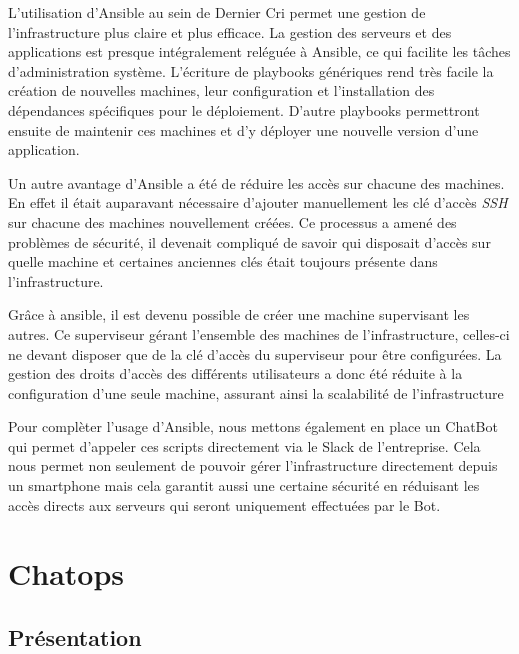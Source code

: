 \documentclass[12pt,a4paper]{article}
\begin{document}
  L'utilisation d'Ansible au sein de Dernier Cri permet une gestion de
  l'infrastructure plus claire et plus efficace. La gestion des serveurs
  et des applications est presque intégralement reléguée à Ansible, ce qui
  facilite les tâches d'administration système. L'écriture de playbooks
  génériques rend très facile la création de nouvelles machines, leur
  configuration et l'installation des dépendances spécifiques pour le
  déploiement. D'autre playbooks permettront ensuite de maintenir ces
  machines et d'y déployer une nouvelle version d'une application.

  \bigskip

  Un autre avantage d'Ansible a été de réduire les accès sur chacune des
  machines. En effet il était auparavant nécessaire d'ajouter manuellement
  les clé d'accès \emph{SSH} sur chacune des machines nouvellement créées.
  Ce processus a amené des problèmes de sécurité, il devenait compliqué de
  savoir qui disposait d'accès sur quelle machine et certaines anciennes
  clés était toujours présente dans l'infrastructure.

  \bigskip

  Grâce à ansible, il est devenu possible de créer une machine supervisant
  les autres. Ce superviseur gérant l'ensemble des machines de
  l'infrastructure, celles-ci ne devant disposer que de la clé d'accès du
  superviseur pour être configurées. La gestion des droits d'accès des
  différents utilisateurs a donc été réduite à la configuration d'une
  seule machine, assurant ainsi la scalabilité de l'infrastructure

  \bigskip

  Pour complèter l'usage d'Ansible, nous mettons également en place un
  ChatBot qui permet d'appeler ces scripts directement via le Slack de
  l'entreprise. Cela nous permet non seulement de pouvoir gérer
  l'infrastructure directement depuis un smartphone mais cela garantit
  aussi une certaine sécurité en réduisant les accès directs aux serveurs
  qui seront uniquement effectuées par le Bot.

  \newpage

  \section{Chatops}\label{chatops}

  \subsection{Présentation}\label{pruxe9sentation-1}
\end{document}

